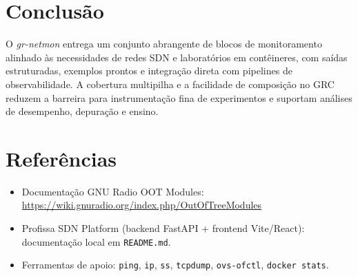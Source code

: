 \documentclass[11pt,a4paper]{article}
\begin{document}
\section{Conclusão}
O \textit{gr-netmon} entrega um conjunto abrangente de blocos de monitoramento alinhado às necessidades de redes SDN e laboratórios em contêineres, com saídas estruturadas, exemplos prontos e integração direta com pipelines de observabilidade. A cobertura multipilha e a facilidade de composição no GRC reduzem a barreira para instrumentação fina de experimentos e suportam análises de desempenho, depuração e ensino.

\section*{Referências}
\begin{itemize}[leftmargin=1.5em]
  \item Documentação GNU Radio OOT Modules: \url{https://wiki.gnuradio.org/index.php/OutOfTreeModules}
  \item Profissa SDN Platform (backend FastAPI + frontend Vite/React): documentação local em \texttt{README.md}.
  \item Ferramentas de apoio: \texttt{ping}, \texttt{ip}, \texttt{ss}, \texttt{tcpdump}, \texttt{ovs-ofctl}, \texttt{docker stats}.
\end{itemize}
\end{document}
